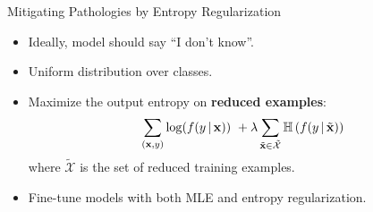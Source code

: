 \begin{frame}{Mitigating Pathologies by Entropy Regularization}
\begin{itemize}
\item Ideally, model should say ``I don't know''.
\item Uniform distribution over classes.
\pause
\item Maximize the output entropy on \textbf{reduced examples}:  
\begin{equation}
\sum_{(\boldsymbol{\mathbf{x}}, y)}\log(f(y \, | \, \boldsymbol{\mathbf{x}})) \
+ \lambda\sum_{\tilde{\boldsymbol{\mathbf{x}}}\in \tilde{\mathcal{X}}}
\mathbb{H}\left(f(y \, | \, \tilde{\boldsymbol{\mathbf{x}}})\right) \nonumber
\end{equation}
where $\tilde{\mathcal{X}}$ is the set of reduced training examples.
\item Fine-tune models with both MLE and entropy regularization.
\end{itemize}
\end{frame}

